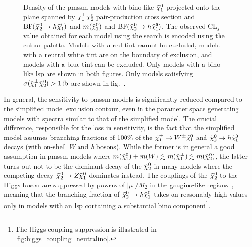 \begin{figure}
\begin{subfigure}[b]{0.5\linewidth}
		\vspace{-2em}
		\caption{\label{fig:fig_scatter_mchi10_BFHiggs_bino_withXsecCut}}
	\end{subfigure}\hfill
	\caption{Density of the \gls{pmssm} models with bino-like $\tilde{\chi}_1^0$ projected onto the plane spanned by  $\tilde{\chi}_1^\pm\tilde{\chi}_2^0$ pair-production cross section and $\mathrm{BF}(\tilde{\chi}_2^0 \rightarrow h \tilde{\chi}_1^0)$ and  $m(\tilde{\chi}_1^0)$ and $\mathrm{BF}(\tilde{\chi}_2^0 \rightarrow h \tilde{\chi}_1^0)$. The observed CL$_s$ value obtained for each model using the \onelepton search is encoded using the colour-palette. Models with a red tint cannot be excluded, models with a neutral white tint are on the boundary of exclusion, and models with a blue tint can be excluded. Only models with a bino-like \gls{lsp} are shown in both figures. Only models satisfying $\sigma(\charg\neutr)>\SI{1}{\femto\barn}$ are shown in fig.~.}
	\label{fig:bino_sensitivity}
\end{figure}

In general, the sensitivity to \gls{pmssm} models is significantly reduced compared to the simplified model exclusion contour, even in the parameter space generating models with spectra similar to that of the simplified model. The crucial difference, responsible for the loss in sensitivity, is the fact that the simplified model assumes branching fractions of 100\% of the $\tilde{\chi}_1^\pm \rightarrow W^\pm \tilde{\chi}_1^0$ and $\tilde{\chi}_2^0 \rightarrow h \tilde{\chi}_1^0$ decays (with on-shell \textit{W} and \textit{h} bosons).
While the former is in general a good assumption in \gls{pmssm} models where $m(\tilde{\chi}_1^0)+m(W) \lesssim m(\tilde{\chi}_1^\pm)\lesssim m(\tilde{\chi}_2^0)$, the latter turns out not to be the dominant decay of the $\tilde{\chi}_2^0$ in many models where the competing decay $\tilde{\chi}_2^0 \rightarrow Z \tilde{\chi}_1^0$ dominates instead.
The couplings of the $\tilde{\chi}_2^0$ to the Higgs boson are suppressed by powers of $\vert\mu\vert/M_2$ in the gaugino-like regions~\cite{Arbey:2012fa}, meaning that the branching fraction of $\tilde{\chi}_2^0 \rightarrow h \tilde{\chi}_1^0$ takes on reasonably high values only in models with an \gls{lsp} containing a substantial bino component\footnote{The Higgs coupling suppression is illustrated in \cref{fig:higgs_coupling_neutralino}.}.

